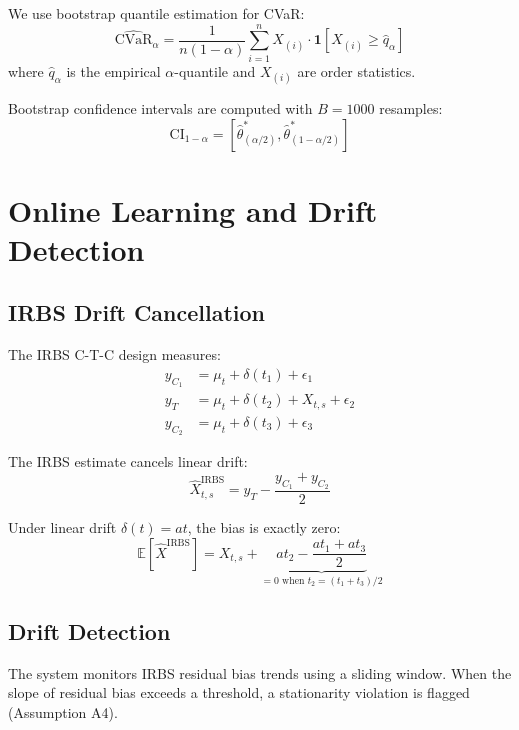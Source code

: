 \documentclass[11pt,twocolumn]{article}
\begin{document}
We use bootstrap quantile estimation for CVaR:
\begin{equation}
\widehat{\text{CVaR}}_\alpha = \frac{1}{n(1-\alpha)} \sum_{i=1}^{n} X_{(i)} \cdot \mathbf{1}[X_{(i)} \geq \hat{q}_\alpha]
\end{equation}
where $\hat{q}_\alpha$ is the empirical $\alpha$-quantile and $X_{(i)}$
are order statistics.

Bootstrap confidence intervals are computed with $B=1000$ resamples:
\begin{equation}
\text{CI}_{1-\alpha} = \left[\hat{\theta}^*_{(\alpha/2)}, \hat{\theta}^*_{(1-\alpha/2)}\right]
\end{equation}

\section{Online Learning and Drift Detection}

\subsection{IRBS Drift Cancellation}

The IRBS C-T-C design measures:
\begin{align}
y_{C_1} &= \mu_t + \delta(t_1) + \epsilon_1 \\
y_T &= \mu_t + \delta(t_2) + X_{t,s} + \epsilon_2 \\
y_{C_2} &= \mu_t + \delta(t_3) + \epsilon_3
\end{align}

The IRBS estimate cancels linear drift:
\begin{equation}
\hat{X}_{t,s}^{\text{IRBS}} = y_T - \frac{y_{C_1} + y_{C_2}}{2}
\end{equation}

Under linear drift $\delta(t) = at$, the bias is exactly zero:
\begin{equation}
\mathbb{E}[\hat{X}^{\text{IRBS}}] = X_{t,s} + \underbrace{a t_2 - \frac{a t_1 + a t_3}{2}}_{= 0 \text{ when } t_2 = (t_1+t_3)/2}
\end{equation}

\subsection{Drift Detection}

The system monitors IRBS residual bias trends using a sliding window.
When the slope of residual bias exceeds a threshold, a stationarity
violation is flagged (Assumption A4).
\end{document}
